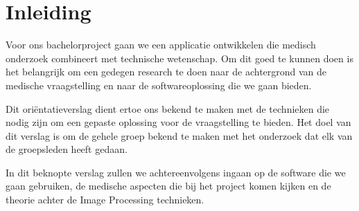 \section{Inleiding}
\label{inleiding}
Voor ons bachelorproject gaan we een applicatie ontwikkelen die medisch onderzoek combineert met technische wetenschap. Om dit goed te kunnen doen is het belangrijk om een gedegen research te doen naar de achtergrond van de medische vraagstelling en naar de softwareoplossing die we gaan bieden.

Dit ori\"{e}ntatieverslag dient ertoe ons bekend te maken met de technieken die nodig zijn om een gepaste oplossing voor de vraagstelling te bieden. Het doel van dit verslag is om de gehele groep bekend te maken met het onderzoek dat elk van de groepsleden heeft gedaan.

In dit beknopte verslag zullen we achtereenvolgens ingaan op de software die we gaan gebruiken, de medische aspecten die bij het project komen kijken en de theorie achter de Image Processing technieken.
